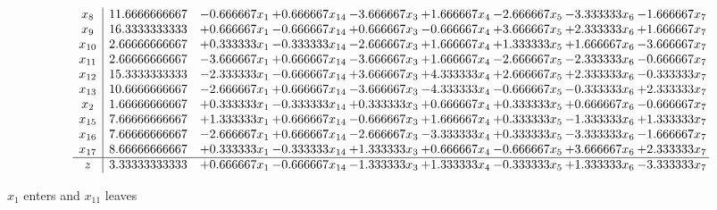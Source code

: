 \documentclass[10pt]{article}
\begin{document}
 \[\begin{array}{c| c c@{\hskip 2pt} c@{\hskip 2pt} c@{\hskip 2pt} c@{\hskip 2pt} c@{\hskip 2pt} c@{\hskip 2pt} c@{\hskip 2pt} }
 x_{8}   &  11.6666666667 & -0.666667 x_{1} & + 0.666667 x_{14} & -3.666667 x_{3} & + 1.666667 x_{4} & -2.666667 x_{5} & -3.333333 x_{6} & -1.666667 x_{7}\\
 x_{9}   &  16.3333333333 & + 0.666667 x_{1} & -0.666667 x_{14} & + 0.666667 x_{3} & -0.666667 x_{4} & + 3.666667 x_{5} & + 2.333333 x_{6} & + 1.666667 x_{7}\\
 x_{10}   &  2.66666666667 & + 0.333333 x_{1} & -0.333333 x_{14} & -2.666667 x_{3} & + 1.666667 x_{4} & + 1.333333 x_{5} & + 1.666667 x_{6} & -3.666667 x_{7}\\
 x_{11}   &  2.66666666667 & -3.666667 x_{1} & + 0.666667 x_{14} & -3.666667 x_{3} & + 1.666667 x_{4} & -2.666667 x_{5} & -2.333333 x_{6} & -0.666667 x_{7}\\
 x_{12}   &  15.3333333333 & -2.333333 x_{1} & -0.666667 x_{14} & + 3.666667 x_{3} & + 4.333333 x_{4} & + 2.666667 x_{5} & + 2.333333 x_{6} & -0.333333 x_{7}\\
 x_{13}   &  10.6666666667 & -2.666667 x_{1} & + 0.666667 x_{14} & -3.666667 x_{3} & -4.333333 x_{4} & -0.666667 x_{5} & -0.333333 x_{6} & + 2.333333 x_{7}\\
 x_{2}   &  1.66666666667 & + 0.333333 x_{1} & -0.333333 x_{14} & + 0.333333 x_{3} & + 0.666667 x_{4} & + 0.333333 x_{5} & + 0.666667 x_{6} & -0.666667 x_{7}\\
 x_{15}   &  7.66666666667 & + 1.333333 x_{1} & + 0.666667 x_{14} & -0.666667 x_{3} & + 1.666667 x_{4} & + 0.333333 x_{5} & -1.333333 x_{6} & + 1.333333 x_{7}\\
 x_{16}   &  7.66666666667 & -2.666667 x_{1} & + 0.666667 x_{14} & -2.666667 x_{3} & -3.333333 x_{4} & + 0.333333 x_{5} & -3.333333 x_{6} & -1.666667 x_{7}\\
 x_{17}   &  8.66666666667 & + 0.333333 x_{1} & -0.333333 x_{14} & + 1.333333 x_{3} & + 0.666667 x_{4} & -0.666667 x_{5} & + 3.666667 x_{6} & + 2.333333 x_{7}\\
\hline
z    &  3.33333333333 & + 0.666667 x_{1} & -0.666667 x_{14} & -1.333333 x_{3} & + 1.333333 x_{4} & -0.333333 x_{5} & + 1.333333 x_{6} & -3.333333 x_{7}\\
\end{array}\]


 $ x_{1} $ enters and $ x_{11} $ leaves 
\end{document}
